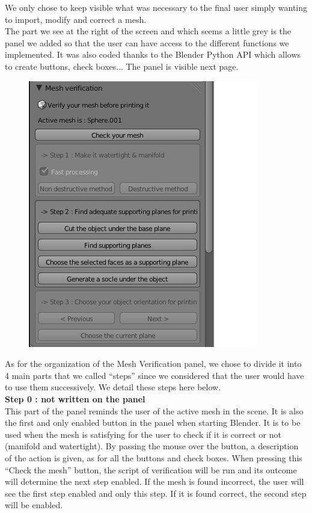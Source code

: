 \documentclass{report}
\begin{document}
\bigskip
\bigskip

We only chose to keep visible what was necessary to the final user simply wanting to import, modify and correct a mesh.\\

The part we see at the right of the screen and which seems a little grey is the panel we added so that the user can have access to the different functions we implemented. It was also coded thanks to the Blender Python API which allows to create buttons, check boxes... The panel is visible next page.

\newpage

\bigskip
\begin{figure}[!h]
\begin{center}
	\includegraphics[scale=1]{Panel}
\end{center}
\end{figure}
\bigskip

As for the organization of the Mesh Verification panel, we chose to divide it into 4 main parts that we called ``steps'' since we considered that the user would have to use them successively. We detail these steps here below.\\

\textbf{Step 0 : not written on the panel} \\

This part of the panel reminds the user of the active mesh in the scene. It is also the first and only enabled button in the panel when starting Blender. It is to be used when the mesh is satisfying for the user to check if it is correct or not (manifold and watertight). By passing the mouse over the button, a description of the action is given, as for all the buttons and check boxes. When pressing this ``Check the mesh'' button, the script of verification will be run and its outcome will determine the next step enabled. If the mesh is found incorrect, the user will see the first step enabled and only this step. If it is found correct, the second step will be enabled.\\
\end{document}
